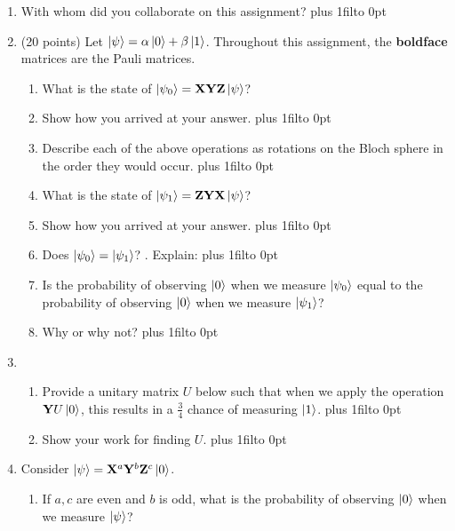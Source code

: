 \documentclass[12pt]{article}
\def\DefaultSpace{1in}
\newcommand{\LeaveSpace}[1][\DefaultSpace]{%
\vskip #1 plus 1fil\relax\hbox to 0pt{\hss} %
}
\begin{document}
\begin{enumerate}[font=\bfseries]
\item With whom did you collaborate on this assignment?
    \LeaveSpace{}
    \item (20 points) Let $\ket{\psi} = \alpha\ket{0} + \beta\ket{1}$. Throughout this assignment, the {\bf boldface} matrices are the Pauli matrices.
    \begin{enumerate}[label=\theenumi.\arabic*]
        \item {} What is the state of $\ket{\psi_0} = \mathbf{X}\mathbf{Y}\mathbf{Z}\ket{\psi}$? \Blank{}
        \item {} Show how you arrived at your answer. \LeaveSpace[0.7in]
        \item {} Describe each of the above operations as rotations on the Bloch sphere in the order they would occur.\LeaveSpace{}
        \item {} What is the state of $\ket{\psi_1} = \mathbf{Z}\mathbf{Y}\mathbf{X}\ket{\psi}$? \Blank{}
        \item {} Show how you arrived at your answer. \LeaveSpace[0.6in]
        \item {} Does $\ket{\psi_0} = \ket{\psi_1}$? \Blank{}.  Explain:\LeaveSpace{}
        \item {} Is the probability of observing $\ket{0}$ when we measure $\ket{\psi_0}$ equal to the probability of observing $\ket{0}$ when we measure $\ket{\psi_1}$?\Blank{}
        \item {} Why or why not? \LeaveSpace{}
    \end{enumerate}
    \item {}
    \begin{enumerate}[label=\theenumi.\arabic*]
    \item {} Provide a unitary matrix $U$ below such that when we apply the operation $\mathbf{Y}U\ket{0}$, this results in a $\frac{3}{4}$ chance of measuring $\ket{1}$. \LeaveSpace{}
    \item {} Show your work for finding $U$. \LeaveSpace[2.0in]
    \end{enumerate}
    \item {} Consider $\ket{\psi} = \mathbf{X}^a\mathbf{Y}^b\mathbf{Z}^c\ket{0}$.
    \begin{enumerate}[label=\theenumi.\arabic*]
        \item {} If $a,c$ are even and $b$ is odd, what is the probability of observing $\ket{0}$ when we measure $\ket{\psi}$? \Blank{}

\end{enumerate}
\end{enumerate}
\end{document}

